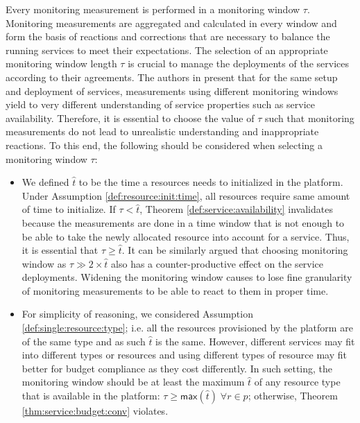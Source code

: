 Every monitoring measurement is performed in a monitoring window $\tau$.
Monitoring measurements are aggregated and calculated in every window and form the basis of reactions and corrections that are necessary to balance the running services to meet their expectations.
The selection of an appropriate monitoring window length $\tau$ is crucial to manage the deployments of the services according to their agreements. 
The authors in \cite{hogben2013defavail} present that for the same setup and deployment of services, measurements using different monitoring windows yield to very different understanding of service properties such as service availability.
Therefore, it is essential to choose the value of $\tau$ such that monitoring measurements do not lead to unrealistic understanding and inappropriate reactions.
To this end, the following should be considered when selecting a monitoring window $\tau$:
\begin{itemize}
\item We defined $\hat{t}$ to be the time a resources needs to initialized in the platform.
Under Assumption \ref{def:resource:init:time}, all resources require same amount of time to initialize.
If $\tau < \hat{t}$, Theorem \ref{def:service:availability} invalidates because the measurements are done in a time window that is not enough to be able to take the newly allocated resource into account for a service.
Thus, it is essential that $\tau \geq \hat{t}$.
It can be similarly argued that choosing monitoring window as $\tau \gg 2 \times \hat{t}$ also has a counter-productive effect on the service deployments.
Widening the monitoring window causes to lose fine granularity of monitoring measurements to be able to react to them in proper time.
\item For simplicity of reasoning, we considered Assumption \ref{def:single:resource:type};
i.e. all the resources provisioned by the platform are of the same type and as such $\hat{t}$ is the same.
However, different services may fit into different types or resources and using different types of resource may fit better for budget compliance as they cost differently.
In such setting, the monitoring window should be at least the maximum $\hat{t}$ of any resource type that is available in the platform: $\tau \geq \mathsf{max}(\hat{t}) \; \forall r \in p$; otherwise, Theorem \ref{thm:service:budget:conv} violates.
\end{itemize}

